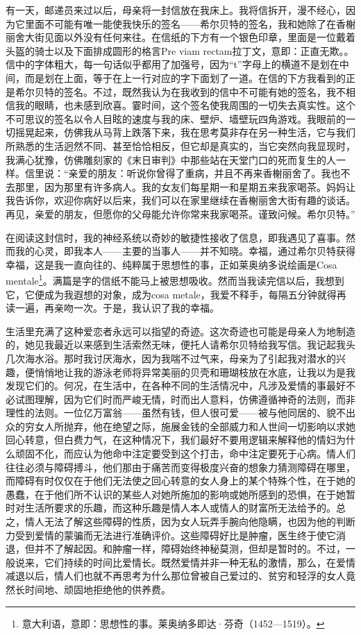 \par 有一天，邮递员来过以后，母亲将一封信放在我床上。我将信拆开，漫不经心，因为它里面不可能有唯一能使我快乐的签名——希尔贝特的签名，我和她除了在香榭丽舍大街见面以外没有任何来往。在信纸的下方有一个银色印章，里面是一位戴着头盔的骑士以及下面排成圆形的格言Pre viam rectam拉丁文，意即：正直无欺。。信中的字体粗大，每一句话似乎都用了加强号，因为“t”字母上的横道不是划在中间，而是划在上面，等于在上一行对应的字下面划了一道。在信的下方我看到的正是希尔贝特的签名。不过，既然我认为在我收到的信中不可能有她的签名，我不相信我的眼睛，也未感到欣喜。霎时间，这个签名使我周围的一切失去真实性。这个不可思议的签名以令人目眩的速度与我的床、壁炉、墙壁玩四角游戏。我眼前的一切摇晃起来，仿佛我从马背上跌落下来，我在思考莫非存在另一种生活，它与我们所熟悉的生活迥然不同、甚至恰恰相反，但它却是真实的，当它突然向我显现时，我满心犹豫，仿佛雕刻家的《末日审判》中那些站在天堂门口的死而复生的人一样。信里说：“亲爱的朋友：听说你曾得了重病，并且不再来香榭丽舍了。我也不去那里，因为那里有许多病人。我的女友们每星期一和星期五来我家喝茶。妈妈让我告诉你，欢迎你病好以后来，我们可以在家里继续在香榭丽舍大街有趣的谈话。再见，亲爱的朋友，但愿你的父母能允许你常来我家喝茶。谨致问候。希尔贝特。”
\par 在阅读这封信时，我的神经系统以奇妙的敏捷性接收了信息，即我遇见了喜事。然而我的心灵，即我本人——主要的当事人——并不知晓。幸福，通过希尔贝特获得幸福，这是我一直向往的、纯粹属于思想性的事，正如莱奥纳多说绘画是Cosa mentale\footnote{意大利语，意即：思想性的事。莱奥纳多即达·芬奇（1452—1519）。}。满篇是字的信纸不能马上被思想吸收。然而当我读完信以后，我想到它，它便成为我遐想的对象，成为cosa metale，我爱不释手，每隔五分钟就得再读一遍，再亲吻一次。于是，我认识了我的幸福。
\par 生活里充满了这种爱恋者永远可以指望的奇迹。这次奇迹也可能是母亲人为地制造的，她见我最近以来感到生活索然无味，便托人请希尔贝特给我写信。我记起我头几次海水浴。那时我讨厌海水，因为我喘不过气来，母亲为了引起我对潜水的兴趣，便悄悄地让我的游泳老师将异常美丽的贝壳和珊瑚枝放在水底，让我以为是我发现它们的。何况，在生活中，在各种不同的生活情况中，凡涉及爱情的事最好不必试图理解，因为它们时而严峻无情，时而出人意料，仿佛遵循神奇的法则，而非理性的法则。一位亿万富翁——虽然有钱，但人很可爱——被与他同居的、貌不出众的穷女人所抛弃，他在绝望之际，施展金钱的全部威力和人世间一切影响以求她回心转意，但白费力气，在这种情况下，我们最好不要用逻辑来解释他的情妇为什么顽固不化，而应认为他命中注定要受到这个打击，命中注定要死于心病。情人们往往必须与障碍搏斗，他们那由于痛苦而变得极度兴奋的想象力猜测障碍在哪里，而障碍有时仅仅在于他们无法使之回心转意的女人身上的某个特殊个性，在于她的愚蠢，在于他们所不认识的某些人对她所施加的影响或她所感到的恐惧，在于她暂时对生活所要求的乐趣，而这种乐趣是情人本人或情人的财富所无法给予的。总之，情人无法了解这些障碍的性质，因为女人玩弄手腕向他隐瞒，也因为他的判断力受到爱情的蒙骗而无法进行准确评价。这些障碍好比是肿瘤，医生终于使它消退，但并不了解起因。和肿瘤一样，障碍始终神秘莫测，但却是暂时的。不过，一般说来，它们持续的时间比爱情长。既然爱情并非一种无私的激情，那么，在爱情减退以后，情人们也就不再思考为什么那位曾被自己爱过的、贫穷和轻浮的女人竟然长时间地、顽固地拒绝他的供养费。
